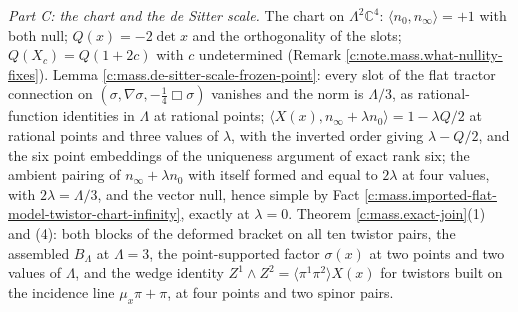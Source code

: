 \documentclass[11pt]{article}
\theoremstyle{definition}
\theoremstyle{plain}
\providecommand{\C}{}\renewcommand{\C}{\mathbb{C}}
\providecommand{\br}{}\renewcommand{\br}[1]{\langle #1\rangle}
\providecommand{\ip}{}\renewcommand{\ip}[2]{\langle #1, #2\rangle}
\begin{document}
\emph{Part C: the chart and the de Sitter scale.} The chart on $\Lambda^{2}\C^{4}$: $\ip{n_{0}}{n_{\infty}} = +1$ with both null; $Q(x) = -2\det x$ and the orthogonality of the slots; $Q(X_{c}) = Q(1+2c)$ with $c$ undetermined (Remark \ref{c:note.mass.what-nullity-fixes}). Lemma \ref{c:mass.de-sitter-scale-frozen-point}: every slot of the flat tractor connection on $(\sigma, \nabla\sigma, -\tfrac14\Box\sigma)$ vanishes and the norm is $\Lambda/3$, as rational-function identities in $\Lambda$ at rational points; $\ip{X(x)}{n_{\infty} + \lambda n_{0}} = 1 - \lambda Q/2$ at rational points and three values of $\lambda$, with the inverted order giving $\lambda - Q/2$, and the six point embeddings of the uniqueness argument of exact rank six; the ambient pairing of $n_{\infty} + \lambda n_{0}$ with itself formed and equal to $2\lambda$ at four values, with $2\lambda = \Lambda/3$, and the vector null, hence simple by Fact \ref{c:mass.imported-flat-model-twistor-chart-infinity}, exactly at $\lambda = 0$. Theorem \ref{c:mass.exact-join}(1) and (4): both blocks of the deformed bracket on all ten twistor pairs, the assembled $B_{\Lambda}$ at $\Lambda = 3$, the point-supported factor $\sigma(x)$ at two points and two values of $\Lambda$, and the wedge identity $Z^{1}\wedge Z^{2} = \br{\pi^{1}\pi^{2}}X(x)$ for twistors built on the incidence line $\mu_{x}\pi + \pi$, at four points and two spinor pairs.
\end{document}
